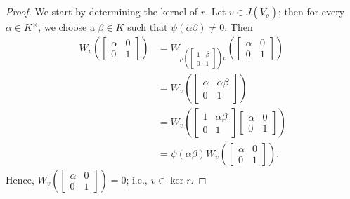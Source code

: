 \documentclass[../main.tex]{subfiles}
\begin{document}
\begin{proof}
	We start by determining the kernel of $r$. Let $v\in J(V_\rho)$; then for every $\alpha\in K^\times$, we choose a $\beta\in K$ such that $\psi(\alpha\beta)\ne0$. Then
	\begin{align*}
		W_v\left(\begin{bmatrix}
			\alpha & 0 \\
			0 & 1
		\end{bmatrix}\right) &= W_{\rho\left(\begin{bmatrix}
			1 & \beta \\
			0 & 1
		\end{bmatrix}\right)v}\left(\begin{bmatrix}
			\alpha & 0 \\
			0 & 1
		\end{bmatrix}\right) \\
		&= W_v\left(\begin{bmatrix}
			\alpha & \alpha\beta \\
			0 & 1
		\end{bmatrix}\right) \\
		&= W_v\left(\begin{bmatrix}
			1 & \alpha\beta \\
			0 & 1
		\end{bmatrix}\begin{bmatrix}
			\alpha & 0 \\
			0 & 1
		\end{bmatrix}\right) \\
		&= \psi(\alpha\beta)W_v\left(\begin{bmatrix}
			\alpha & 0 \\
			0 & 1
		\end{bmatrix}\right).
	\end{align*}
	Hence, $W_v\left(\begin{bmatrix}
		\alpha & 0 \\
		0 & 1
	\end{bmatrix}\right)=0$; i.e., $v\in\ker r$.


\end{proof}
\end{document}
